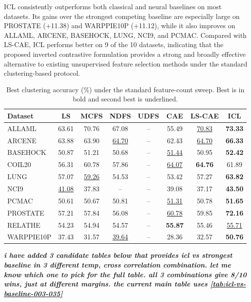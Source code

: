 \documentclass[sigconf,natbib=true,anonymous=true]{acmart}
\begin{document}
ICL consistently outperforms both classical and neural baselines on most
datasets. Its gains over the strongest competing baseline are especially large
on PROSTATE (+11.38) and WARPPIE10P (+11.12), while it also improves on
ALLAML, ARCENE, BASEHOCK, LUNG, NCI9, and PCMAC. Compared with LS-CAE, ICL
performs better on 9 of the 10 datasets, indicating that the proposed inverted
contrastive formulation provides a strong and broadly effective alternative to
existing unsupervised feature selection methods under the standard
clustering-based protocol.


\begin{table}[h]
  \caption{Best clustering accuracy (\%) under the standard feature-count sweep. Best is in bold and second best is underlined.}
  \label{tab:main-results}
  \centering
  \begin{tabular}{lccccccc}
    \toprule
    Dataset & LS & MCFS & NDFS & UDFS & CAE & LS-CAE & ICL \\
    \midrule
    ALLAML     & 63.61 & 70.76 & 67.08 & -- & 55.49 & \underline{70.83} & \textbf{73.33} \\
    ARCENE     & 63.88 & 63.90 & \underline{64.70} & -- & 62.43 & \underline{64.70} & \textbf{66.33} \\
    BASEHOCK   & 50.87 & 51.21 & 50.68 & -- & \underline{51.44} & 50.95 & \textbf{52.42} \\
    COIL20     & 56.31 & 60.78 & 57.86 & -- & \underline{64.07} & \textbf{64.76} & 61.89 \\
    LUNG       & 57.07 & \underline{59.26} & 54.53 & -- & 53.42 & 57.27 & \textbf{63.82} \\
    NCI9       & \underline{41.08} & 37.83 & -- & -- & 39.08 & 37.17 & \textbf{43.50} \\
    PCMAC      & 50.61 & 50.67 & 50.81 & -- & \underline{51.31} & 50.78 & \textbf{51.65} \\
    PROSTATE   & 57.21 & 57.84 & 56.08 & -- & \underline{60.78} & 59.85 & \textbf{72.16} \\
    RELATHE    & 54.23 & 54.94 & 54.57 & -- & \textbf{55.87} & 55.46 & \underline{55.71} \\
    WARPPIE10P & 37.43 & 31.57 & \underline{39.64} & -- & 28.36 & 32.57 & \textbf{50.76} \\
    \bottomrule
  \end{tabular}
\end{table}


\textbf{\textit{i have added 3 candidate tables below that provides icl vs strongest baseline in 3 different temp, cross correlation combination. let me know which one to pick for the full table. all 3 combinations give 8/10 wins, just at different margins. the current main table uses \ref{tab:icl-vs-baseline-003-035}}}
\end{document}
